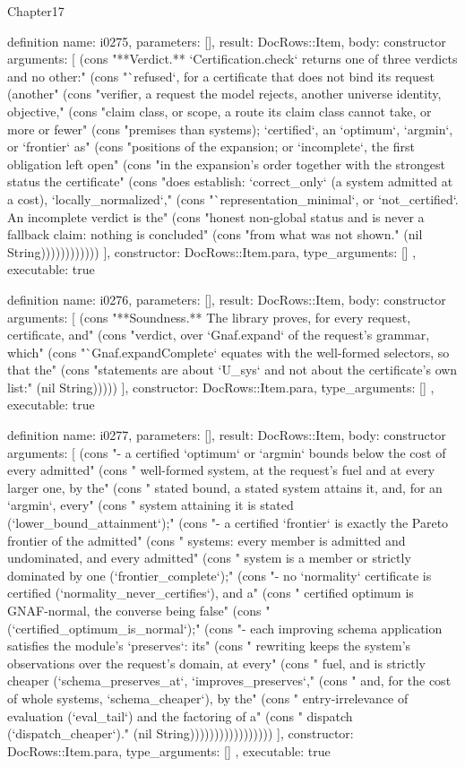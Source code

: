 \begin{lexlean}{Chapter17}
\begin{semanticmodule}
definition{
  name: i0275,
  parameters: [],
  result: DocRows::Item,
  body: constructor{
    arguments: [
      (cons "**Verdict.** `Certification.check` returns one of three verdicts and no other:" (cons "`refused`, for a certificate that does not bind its request (another" (cons "verifier, a request the model rejects, another universe identity, objective," (cons "claim class, or scope, a route its claim class cannot take, or more or fewer" (cons "premises than systems); `certified`, an `optimum`, `argmin`, or `frontier` as" (cons "positions of the expansion; or `incomplete`, the first obligation left open" (cons "in the expansion's order together with the strongest status the certificate" (cons "does establish: `correct_only` (a system admitted at a cost), `locally_normalized`," (cons "`representation_minimal`, or `not_certified`. An incomplete verdict is the" (cons "honest non-global status and is never a fallback claim: nothing is concluded" (cons "from what was not shown." (nil String))))))))))))
    ],
    constructor: DocRows::Item.para,
    type_arguments: []
  },
  executable: true
}

definition{
  name: i0276,
  parameters: [],
  result: DocRows::Item,
  body: constructor{
    arguments: [
      (cons "**Soundness.** The library proves, for every request, certificate, and" (cons "verdict, over `Gnaf.expand` of the request's grammar, which" (cons "`Gnaf.expandComplete` equates with the well-formed selectors, so that the" (cons "statements are about `U_sys` and not about the certificate's own list:" (nil String)))))
    ],
    constructor: DocRows::Item.para,
    type_arguments: []
  },
  executable: true
}

definition{
  name: i0277,
  parameters: [],
  result: DocRows::Item,
  body: constructor{
    arguments: [
      (cons "- a certified `optimum` or `argmin` bounds below the cost of every admitted" (cons "  well-formed system, at the request's fuel and at every larger one, by the" (cons "  stated bound, a stated system attains it, and, for an `argmin`, every" (cons "  system attaining it is stated (`lower_bound_attainment`);" (cons "- a certified `frontier` is exactly the Pareto frontier of the admitted" (cons "  systems: every member is admitted and undominated, and every admitted" (cons "  system is a member or strictly dominated by one (`frontier_complete`);" (cons "- no `normality` certificate is certified (`normality_never_certifies`), and a" (cons "  certified optimum is GNAF-normal, the converse being false" (cons "  (`certified_optimum_is_normal`);" (cons "- each improving schema application satisfies the module's `preserves`: its" (cons "  rewriting keeps the system's observations over the request's domain, at every" (cons "  fuel, and is strictly cheaper (`schema_preserves_at`, `improves_preserves`," (cons "  and, for the cost of whole systems, `schema_cheaper`), by the" (cons "  entry-irrelevance of evaluation (`eval_tail`) and the factoring of a" (cons "  dispatch (`dispatch_cheaper`)." (nil String)))))))))))))))))
    ],
    constructor: DocRows::Item.para,
    type_arguments: []
  },
  executable: true
}


\end{semanticmodule}
\end{lexlean}
